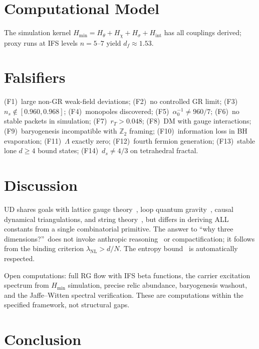 \documentclass[11pt,twocolumn]{article}
\begin{document}
\section{Computational Model}
\label{sec:computation}

The simulation kernel $H_{\min}=H_\theta+H_\chi+H_\sigma+H_{\mathrm{int}}$ has all couplings derived; proxy runs at IFS levels $n=5$--$7$ yield $d_f\approx 1.53$.

\section{Falsifiers}
\label{sec:falsifiers}

(F1)~large non-GR weak-field deviations;
(F2)~no controlled GR limit;
(F3)~$n_s\notin[0.960,0.968]$;
(F4)~monopoles discovered;
(F5)~$\alpha_0^{-1}\neq 960/7$;
(F6)~no stable packets in simulation;
(F7)~$r_T>0.048$;
(F8)~DM with gauge interactions;
(F9)~baryogenesis incompatible with $\mathbb{Z}_2$ framing;
(F10)~information loss in BH evaporation;
(F11)~$\Lambda$ exactly zero;
(F12)~fourth fermion generation;
(F13)~stable lone $d{\geq}4$ bound states;
(F14)~$d_s\neq 4/3$ on tetrahedral fractal.

\section{Discussion}
\label{sec:discussion}

UD shares goals with lattice gauge theory~\cite{wilson1974}, loop quantum gravity~\cite{rovelli2004}, causal dynamical triangulations, and string theory~\cite{polyakov1987}, but differs in deriving ALL constants from a single combinatorial primitive.
The answer to ``why three dimensions?''\ does not invoke anthropic reasoning~\cite{weinberg1987} or compactification; it follows from the binding criterion $\lambda_{\mathrm{NL}}>d/N$.
The entropy bound~\cite{bekenstein1973} is automatically respected.

Open computations: full RG flow with IFS beta functions, the carrier excitation spectrum from $H_{\min}$ simulation, precise relic abundance, baryogenesis washout, and the Jaffe--Witten spectral verification.
These are computations within the specified framework, not structural gaps.

\section{Conclusion}
\label{sec:conclusion}
\end{document}
